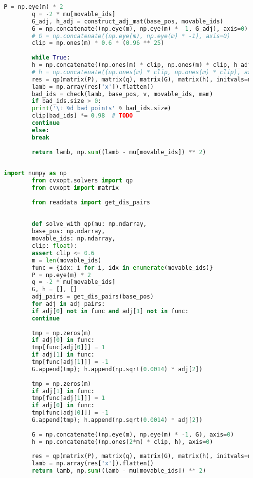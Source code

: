\documentclass[withoutpreface,bwprint,fontset=macnew]{cumcmthesis} %
\begin{document}
\begin{appendices}
\begin{lstlisting}[language=python]
		P = np.eye(m) * 2
		q = -2 * mu[movable_ids]
		G_adj, h_adj = construct_adj_mat(base_pos, movable_ids)
		G = np.concatenate((np.eye(m), np.eye(m) * -1, G_adj), axis=0)
		# G = np.concatenate((np.eye(m), np.eye(m) * -1), axis=0)
		clip = np.ones(m) * 0.6 * (0.96 ** 25)
		
		while True:
		h = np.concatenate((np.ones(m) * clip, np.ones(m) * clip, h_adj), axis=0)
		# h = np.concatenate((np.ones(m) * clip, np.ones(m) * clip), axis=0)
		res = qp(matrix(P), matrix(q), matrix(G), matrix(h), initvals=np.zeros(m))
		lamb = np.array(res['x']).flatten()
		bad_ids = check(lamb, base_pos, v, movable_ids, mam)
		if bad_ids.size > 0:
		print('\t %d bad points' % bad_ids.size)
		clip[bad_ids] *= 0.98  # TODO
		continue
		else:
		break
		
		return lamb, np.sum((lamb - mu[movable_ids]) ** 2)
		
	\end{lstlisting}
	
	\begin{lstlisting}[language=python]
		import numpy as np
		from cvxopt.solvers import qp
		from cvxopt import matrix
		
		from readdata import get_dis_pairs
		
		
		def solve_with_qp(mu: np.ndarray,
		base_pos: np.ndarray,
		movable_ids: np.ndarray,
		clip: float):
		assert clip <= 0.6
		m = len(movable_ids)
		func = {idx: i for i, idx in enumerate(movable_ids)}
		P = np.eye(m) * 2
		q = -2 * mu[movable_ids]
		G, h = [], []
		adj_pairs = get_dis_pairs(base_pos)
		for adj in adj_pairs:
		if adj[0] not in func and adj[1] not in func:
		continue
		
		tmp = np.zeros(m)
		if adj[0] in func:
		tmp[func[adj[0]]] = 1
		if adj[1] in func:
		tmp[func[adj[1]]] = -1
		G.append(tmp); h.append(np.sqrt(0.0014) * adj[2])
		
		tmp = np.zeros(m)
		if adj[1] in func:
		tmp[func[adj[1]]] = 1
		if adj[0] in func:
		tmp[func[adj[0]]] = -1
		G.append(tmp); h.append(np.sqrt(0.0014) * adj[2])
		
		G = np.concatenate((np.eye(m), np.eye(m) * -1, G), axis=0)
		h = np.concatenate((np.ones(2*m) * clip, h), axis=0)
		
		res = qp(matrix(P), matrix(q), matrix(G), matrix(h), initvals=np.zeros(m))
		lamb = np.array(res['x']).flatten()
		return lamb, np.sum((lamb - mu[movable_ids]) ** 2)
		
	\end{lstlisting}
	

\end{appendices}
\end{document}
